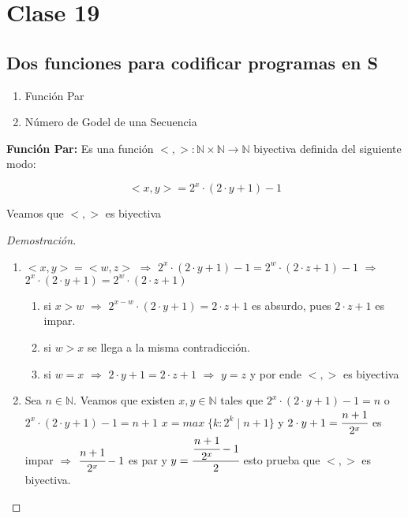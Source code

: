 \section{Clase 19}
 
\subsection{Dos funciones para codificar programas en S}
\hfill
\begin{enumerate}
	\item Funci\'on Par
	\item N\'umero de Godel de una Secuencia
\end{enumerate}
 
\textbf{Funci\'on Par:} Es una funci\'on $<, > \colon \mathbb{N} \times \mathbb{N} \to \mathbb{N}$ biyectiva definida del siguiente modo:
 
\[
	<x, y> = 2^x \cdot (2 \cdot y + 1) - 1
\]
 
Veamos que $<, >$ es biyectiva
 
\begin{proof}[Demostraci\'on]
\hfill
\begin{enumerate}
	\item $<x, y> = <w, z>$ $\Rightarrow$ $2^x \cdot (2 \cdot y + 1) - 1 = 2^w \cdot (2 \cdot z + 1) - 1$ $\Rightarrow$ $2^x \cdot (2 \cdot y + 1) = 2^w \cdot (2 \cdot z + 1)$
		\begin{enumerate}
			\item[] si $x > w$ $\Rightarrow$ $2^{x - w} \cdot (2 \cdot y + 1) = 2 \cdot z + 1$ es absurdo, pues $2 \cdot z + 1$ es impar.
			\item[] si $w > x$ se llega a la misma contradicci\'on.
			\item[] si $w = x$ $\Rightarrow$ $2 \cdot y + 1 = 2 \cdot z + 1$ $\Rightarrow$ $y = z$ y por ende $<, >$ es biyectiva
		\end{enumerate}
	\item Sea $n \in \mathbb{N}$. Veamos que existen $x, y \in \mathbb{N}$ tales que $2^x \cdot (2 \cdot y + 1) - 1 = n$ o $2^x \cdot (2 \cdot y + 1) - 1 = n + 1$ $x = max \; \{ k : 2^k  \mid n+ 1 \}$ y $2 \cdot y + 1 = \cfrac{n + 1}{2^x}$ es impar $\Rightarrow$ $\cfrac{n + 1}{2^x} - 1$ es par y $y = \cfrac{\cfrac{n + 1}{2^x} - 1}{2}$ esto prueba que $<, >$ es biyectiva.
\end{enumerate}
\end{proof}
 
